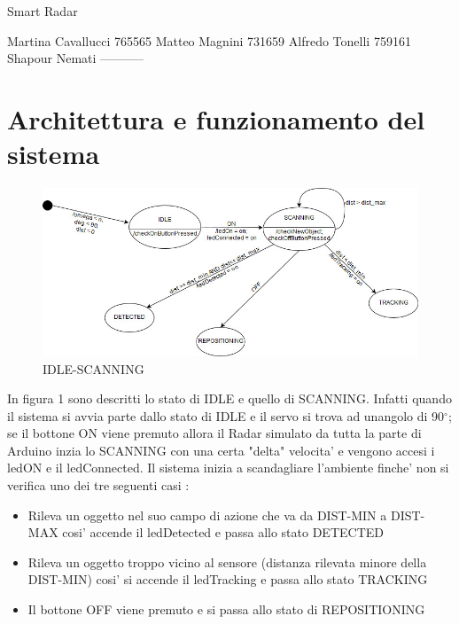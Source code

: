 \documentclass[a4paper]{article}
\begin{document}
	\begin{center}{\Huge \centering  Smart Radar }
			\end{center}
	{\fontsize{10}{12} Martina Cavallucci  765565
		\newline Matteo Magnini      731659
		\newline Alfredo Tonelli 759161
		\newline Shapour Nemati -----------
	}
	
	\section{Architettura e funzionamento del sistema}
	   
	\begin{figure}[!htb]
		\centering
			\includegraphics[scale=0.5]{figura1.jpg}
		\caption{IDLE-SCANNING}
	\end{figure}

In figura 1 sono descritti lo stato di IDLE  e quello di SCANNING. Infatti quando il sistema si avvia parte dallo stato di IDLE e il servo si trova ad un\newline angolo di 90$^{\circ}$; se il bottone ON viene premuto allora il Radar simulato da tutta la parte di Arduino inzia lo SCANNING con una certa "delta" velocita' e \newline vengono accesi i ledON e il ledConnected. \newline
Il sistema inizia a scandagliare l'ambiente finche' non si verifica uno dei tre seguenti casi :
\begin{itemize}
	\item Rileva un oggetto nel suo campo di azione che va da DIST-MIN a DIST-MAX cosi' accende il ledDetected e passa allo stato DETECTED
	\item Rileva un oggetto troppo vicino al sensore (distanza rilevata minore della DIST-MIN) cosi' si accende il ledTracking e passa allo stato TRACKING 
	\item Il bottone OFF viene premuto e si passa allo stato di REPOSITIONING
\end{itemize}
\end{document}
